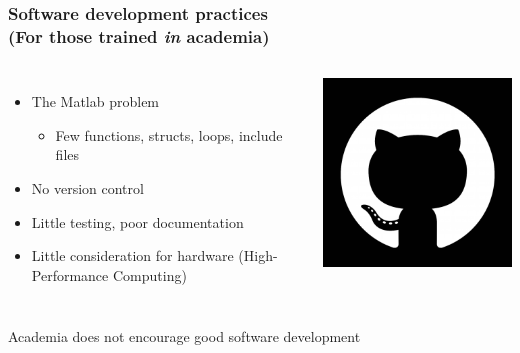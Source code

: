 \documentclass{beamer}
\begin{document}
\begin{frame}
\frametitle{Software development practices \\ \small (For those trained \textit{in} academia)}

\begin{columns}
\begin{itemize}
\item The Matlab problem
\begin{itemize}
\item Few functions, structs, loops, include files
\end{itemize}
\item No version control
\item Little testing, poor documentation
\item Little consideration for hardware (High-Performance Computing)
\end{itemize}

\includegraphics[width=\textwidth]{github.png}
\end{columns}

\begin{center}
\large Academia does not encourage good software development
\end{center}
\end{frame}
\end{document}
